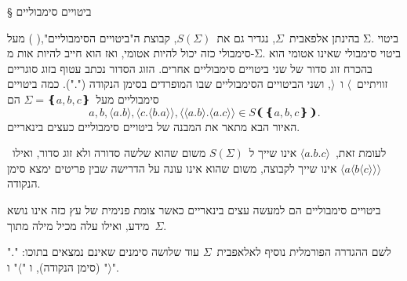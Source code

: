 § ביטויים סימבוליים

בהינתן אלפאבית~$Σ$, נגדיר גם את~$S(Σ)$, קבוצת ה"ביטויים הסימבוליים",(%
%
)
מעל Σ. ביטוי סימבולי כזה יכול להיות אטומי, ואז הוא חייב להיות
אות מ-Σ. ביטוי סימבולי שאינו אטומי הוא בהכרח זוג סדור של שני ביטויים סימבוליים אחרים.
הזוג הסדור נכתב עטוף בזוג סוגריים זוויתיים~$⟨$ ו~$⟩$, ושני הביטויים הסימבוליים
שבו המופרדים בסימן הנקודה (".").
כמה ביטויים סימבוליים מעל~$Σ=❴a,b,c❵$
הם \[
  a,b,⟨a.b⟩,⟨c.⟨b.a⟩⟩,⟨⟨a.b⟩.⟨a.c⟩⟩∈S❨❴a,b,c❵❩.
\] האיור הבא מתאר את המבנה של ביטויים סימבוליים כעצים בינאריים.
\begin{figure}
  \centering
\end{figure}

לעומת זאת,~$⟨a.b.c⟩$
אינו שייך ל~$S(Σ)$
משום שהוא שלשה סדורה ולא זוג סדור, ואילו~$⟨a⟨b⟨c⟩⟩⟩$
אינו שייך לקבוצה, משום שהוא אינו עונה על הדרישה שבין פריטים ימצא סימן הנקודה.

ביטויים סימבוליים הם למעשה עצים בינאריים כאשר צומת פנימית של עץ כזה אינו נושא
מידע, ואילו עלה מכיל מילה מתוך~$Σ$.

לשם ההגדרה הפורמלית נוסיף לאלאפבית~$Σ$ עוד שלושה סימנים שאינם נמצאים בתוכו:
"$.$" (סימן הנקודה), ו "$⟨$" ו "$⟩$".

